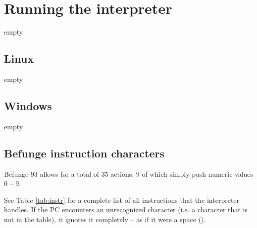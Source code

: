 \documentclass[12pt, a4paper]{article}
\begin{document}
\section{Running the interpreter}
\label{sec:howtorun}

empty

\subsection{Linux}
\label{sec:runlinux}

empty

\subsection{Windows}
\label{sec:runwindows}

empty

\subsection{Befunge instruction characters}
\label{sec:instructions}

Befunge-93 allows for a total of 35 actions, 9 of which simply push numeric values 0 -- 9.

See Table \ref{tab:instr} for a complete list of all instructions that the interpreter handles. If the PC encounters an unrecognized character (i.e. a character that is not in the table), it ignores it completely -- as if it were a space (\textvisiblespace).
\end{document}
